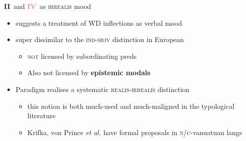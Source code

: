 \documentclass[dvipsnames]{beamer}%
\providecommand{\denote}[2][]{\ensuremath{\llbracket{#2}\rrbracket^{#1}}}
\newcommand{\II}{\textbf{\textcolor{ochre}{II}}}
\newcommand{\IV}{\textbf{\textcolor{violet}{IV}}}
\begin{document}
\begin{frame}{\II~and \IV~as \textsc{irrealis} mood}

	\begin{itemize}
		\item<1-> suggests a treatment of WD inflections as verbal mood
		\item<2-> super dissimilar to the \textsc{ind-sbjv} distinction in European
		\begin{itemize}
			\item<3-> \textsc{not} licensed by subordinating preds \item<4-> Also not licensed by \textbf{epistemic modals}
			
		\end{itemize}
	\item<4-> Paradigm realises a systematic \textsc{realis-irrealis} distinction
	\begin{itemize}
		\item this notion is both much-used and much-maligned in the typological literature
		\item Krifka, von Prince \textit{et al.} have formal proposals in \textsc{n/c-}vanuatuan langs
	\end{itemize}
	\end{itemize}
\end{frame}
\end{document}
